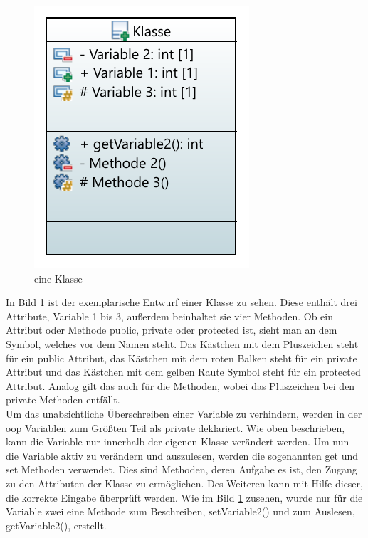 \begin{figure}[H]
	\centering
	\includegraphics[scale=1]{bilder/pdfvorlagen/eineKlasseSVG}
	
	\caption[eine Klasse]{eine Klasse}
	\label{fig:eineklasse}
\end{figure}
 In Bild  \ref{fig:eineklasse} ist der exemplarische Entwurf einer Klasse zu sehen. Diese enthält drei Attribute, Variable 1 bis 3, außerdem beinhaltet sie vier Methoden. Ob ein Attribut oder Methode \glqq public\grqq{},  \glqq private\grqq{} oder \glqq protected\grqq{} ist, sieht man an dem Symbol, welches vor dem Namen steht. Das Kästchen mit dem Pluszeichen steht für ein \glqq public\grqq{} Attribut, das Kästchen mit dem roten Balken steht für ein   \glqq private\grqq{} Attribut und das Kästchen mit dem gelben Raute Symbol steht für ein \glqq protected\grqq{} Attribut. Analog gilt das auch für die Methoden, wobei das Pluszeichen bei den \glqq private\grqq{} Methoden entfällt. \\
 Um das unabsichtliche Überschreiben einer Variable zu verhindern, werden in der \acl{oop} Variablen zum Größten Teil als \glqq private\grqq{} deklariert. Wie oben beschrieben, kann die Variable nur innerhalb der eigenen Klasse verändert werden. Um nun die Variable aktiv zu verändern und auszulesen, werden die sogenannten \glqq get\grqq{} und \glqq set\grqq{} Methoden verwendet. Dies sind Methoden, deren Aufgabe es ist, den Zugang zu den Attributen der Klasse zu ermöglichen. Des Weiteren kann mit Hilfe dieser, die korrekte Eingabe überprüft werden. Wie im Bild \ref{fig:eineklasse} zusehen, wurde nur für die Variable zwei eine Methode zum Beschreiben, \glqq setVariable2()\grqq{} und zum Auslesen, \glqq getVariable2()\grqq{}, erstellt.\\
